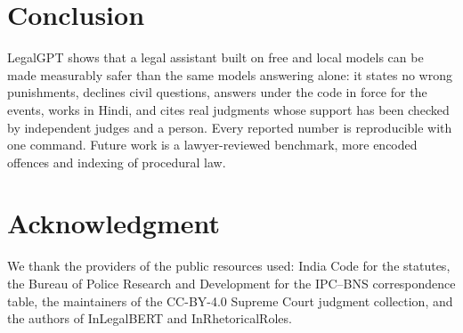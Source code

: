 \documentclass[conference]{IEEEtran}
\begin{document}
\section{Conclusion}

LegalGPT shows that a legal assistant built on free and local models can be made measurably safer
than the same models answering alone: it states no wrong punishments, declines civil questions,
answers under the code in force for the events, works in Hindi, and cites real judgments whose
support has been checked by independent judges and a person. Every reported number is reproducible
with one command. Future work is a lawyer-reviewed benchmark, more encoded offences and indexing of
procedural law.

\section*{Acknowledgment}

We thank the providers of the public resources used: India Code for the statutes, the Bureau of
Police Research and Development for the IPC--BNS correspondence table, the maintainers of the
CC-BY-4.0 Supreme Court judgment collection, and the authors of InLegalBERT and InRhetoricalRoles.
\end{document}
